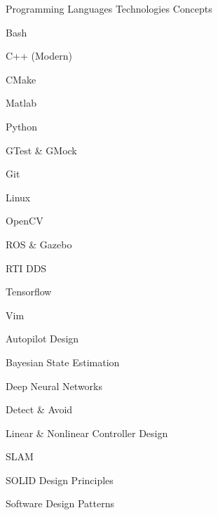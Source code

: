 
\begin{cventries}

  \cventrycol
  {Programming Languages}
  {Technologies}
  {Concepts}
  {
    \begin{cvitems}
      \item {Bash}
      \item {C++ (Modern)}
      \item {CMake}
      \item {Matlab}
      \item {Python}
    \end{cvitems}
  }
  {
    \begin{cvitems}
      \item {GTest \& GMock}
      \item {Git}
      \item {Linux}
      \item {OpenCV}
      \item {ROS \& Gazebo}
      \item {RTI DDS}
      \item {Tensorflow}
      \item {Vim}
    \end{cvitems}
  }
  {
    \begin{cvitems}
      \item {Autopilot Design}
      \item {Bayesian State Estimation}
      \item {Deep Neural Networks}
      \item {Detect \& Avoid}
      \item {Linear \& Nonlinear Controller Design}
      \item {SLAM}
      \item {SOLID Design Principles}
      \item {Software Design Patterns}
    \end{cvitems}
  }

\end{cventries}
